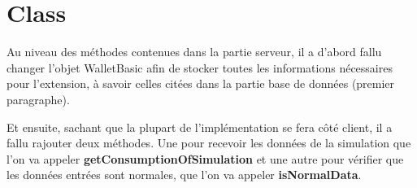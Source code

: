 \section{Class}

\begin{flushleft}
Au niveau des méthodes contenues dans la partie serveur, il a d'abord fallu changer l'objet WalletBasic afin de stocker toutes les informations nécessaires pour l'extension, à savoir celles citées dans la partie base de données (premier paragraphe).
\end{flushleft}

\begin{flushleft}
Et ensuite, sachant que la plupart de l'implémentation se fera côté client, il a fallu rajouter deux méthodes. Une pour recevoir les données de la simulation que l'on va appeler \textbf{getConsumptionOfSimulation} et une autre pour vérifier que les données entrées sont normales, que l'on va appeler \textbf{isNormalData}.
\end{flushleft}


